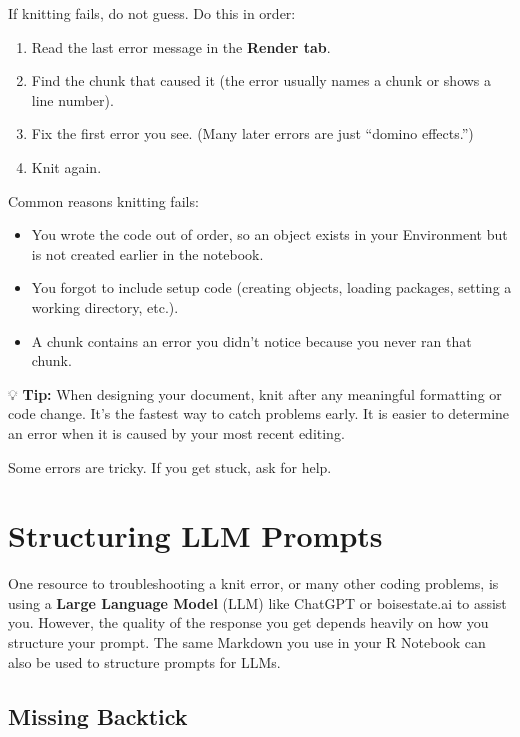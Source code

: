\documentclass[
  12pt,
]{scrreprt}
\begin{document}
If knitting fails, do not guess. Do this in order:

\begin{enumerate}
\def\labelenumi{\arabic{enumi}.}
\item
  Read the last error message in the \textbf{Render tab}.
\item
  Find the chunk that caused it (the error usually names a chunk or
  shows a line number).
\item
  Fix the first error you see. (Many later errors are just ``domino
  effects.'')
\item
  Knit again.
\end{enumerate}

Common reasons knitting fails:

\begin{itemize}
\item
  You wrote the code out of order, so an object exists in your
  Environment but is not created earlier in the notebook.
\item
  You forgot to include setup code (creating objects, loading packages,
  setting a working directory, etc.).
\item
  A chunk contains an error you didn't notice because you never ran that
  chunk.
\end{itemize}

💡 \textbf{Tip:} When designing your document, knit after any meaningful
formatting or code change. It's the fastest way to catch problems early.
It is easier to determine an error when it is caused by your most recent
editing.

Some errors are tricky. If you get stuck, ask for help.

\chapter{Structuring LLM Prompts}\label{structuring-llm-prompts}

One resource to troubleshooting a knit error, or many other coding
problems, is using a \textbf{Large Language Model} (LLM) like ChatGPT or
boisestate.ai to assist you. However, the quality of the response you
get depends heavily on how you structure your prompt. The same Markdown
you use in your R Notebook can also be used to structure prompts for
LLMs.

\section{Missing Backtick}\label{missing-backtick}
\end{document}
